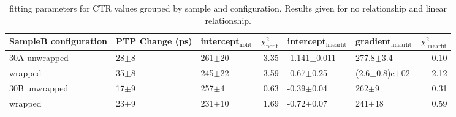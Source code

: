 \begin{table}
\caption{\label{tab:ctrfitresults} fitting parameters for CTR values grouped by sample and configuration. Results given for no relationship and linear relationship.}
\begin{tabular}{lllrllr}
\hline
SampleB configuration & PTP Change (ps) & intercept$_\text{nofit}$ &  $\chi^2_\text{nofit}$ & intercept$_\text{linearfit}$ & gradient$_\text{linearfit}$ &  $\chi^2_\text{linearfit}$ \\
\hline
30A     unwrapped     &  28$\pm$8 &      261$\pm$20 &                   3.35 &    -1.141$\pm$0.011 &      277.8$\pm$3.4 &                    0.10 \\
        wrapped       &  35$\pm$8 &      245$\pm$22 &                   3.59 &      -0.67$\pm$0.25 &  (2.6$\pm$0.8)e+02 &                    2.12 \\
30B     unwrapped     &  17$\pm$9 &       257$\pm$4 &                   0.63 &      -0.39$\pm$0.04 &          262$\pm$9 &                    0.31 \\
        wrapped       &  23$\pm$9 &      231$\pm$10 &                   1.69 &      -0.72$\pm$0.07 &         241$\pm$18 &                    0.59 \\
\hline
\end{tabular}
\end{table}